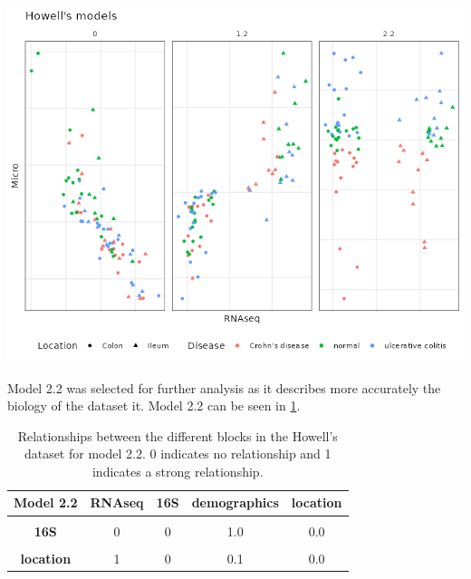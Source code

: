 \documentclass[
  12pt,
  a4paper,
  twoside,
  openright]{book}
\let\origfigure\figure
\let\endorigfigure\endfigure
\renewenvironment{figure}[1][2] {
    \expandafter\origfigure\expandafter[!htbp]
} {
    \endorigfigure
}
\begin{document}
\begin{figure}
\includegraphics[width=1\linewidth]{images/howell-models} \caption[Models from inteRmodel in the Howell's datset.]{Models from inteRmodel in the Howell's datset. The three main models, model 0, 1.2 and 2.2 on the Howell's dataset colored by section colon, ileum and shape according to the disease: square, ulcerative colitis; triangle, normal; circle, Crohn's disease. Model 0 has just trancriptomic and microbiome data, model 1.2 has transcriptomic, microbiome and sample data and model 2.2 has transcriptomic, microbiome and sample data split in different blocks.}\label{fig:howell-models}
\end{figure}

Model 2.2 was selected for further analysis as it describes more accurately the biology of the dataset it.
Model 2.2 can be seen in \ref{tab:howell-model2-2}.

\begin{table}[H]

\caption[Model 2.2 of the Howell's dataset.]{\label{tab:howell-model2-2}Relationships between the different blocks in the Howell's dataset for model 2.2. 0 indicates no relationship and 1 indicates a strong relationship.}
\centering
\begin{tabular}[t]{>{}c|c|c|c|c}
\hline
\textbf{Model 2.2} & \textbf{RNAseq} & \textbf{16S} & \textbf{demographics} & \textbf{location}\\
\hline
\textbf{\cellcolor{gray!6}{RNAseq}} & \cellcolor{gray!6}{0} & \cellcolor{gray!6}{0} & \cellcolor{gray!6}{0.0} & \cellcolor{gray!6}{1.0}\\
\hline
\textbf{16S} & 0 & 0 & 1.0 & 0.0\\
\hline
\textbf{\cellcolor{gray!6}{demographics}} & \cellcolor{gray!6}{0} & \cellcolor{gray!6}{1} & \cellcolor{gray!6}{0.0} & \cellcolor{gray!6}{0.1}\\
\hline
\textbf{location} & 1 & 0 & 0.1 & 0.0\\
\hline
\end{tabular}
\end{table}
\end{document}
